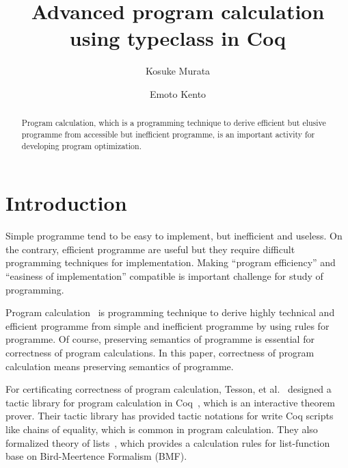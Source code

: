 \documentclass[runningheads, orivec]{llncs}
\begin{document}
%
\title{Advanced program calculation using typeclass in Coq}
%
%
\author{Kosuke Murata \and
Emoto Kento}
%
%
%
\maketitle              %
%
\begin{abstract}
Program calculation, which is a programming technique to derive efficient but elusive programme from accessible but inefficient programme, is an important activity for developing program optimization. 

\end{abstract}
%
%
%
\section{Introduction}

Simple programme tend to be easy to implement, but inefficient and useless. On the contrary, efficient programme are useful but they require difficult programming techniques for implementation. Making ``program efficiency'' and ``easiness of implementation'' compatible is important challenge for study of programming. 

Program calculation~\cite{Bird:1988,Bird:1997} is programming technique to derive highly technical and efficient programme from simple and inefficient programme by using rules for programme. Of course, preserving semantics of programme is essential for correctness of program calculations. In this paper, correctness of program calculation means preserving semantics of programme. 

For certificating correctness of program calculation, Tesson, et al.~\cite{Tesson:2010} designed a tactic library for program calculation in Coq~\cite{}, which is an interactive theorem prover. Their tactic library has provided tactic notations for write Coq scripts like chains of equality, which is common in program calculation. They also formalized theory of lists~\cite{Bird:1988}, which provides a calculation rules for list-function base on Bird-Meertence Formalism (BMF). 
\end{document}
